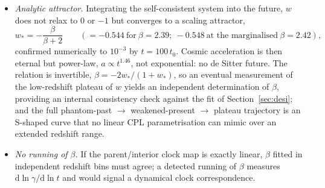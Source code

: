 \documentclass[11pt]{article}
\begin{document}
\begin{itemize}
\item[P7.] \emph{Analytic attractor.} Integrating the self-consistent system into the future, $w$ does not relax to $0$ or $-1$ but converges to a scaling attractor,
\begin{equation}
w_* = -\frac{\beta}{\beta+2} \qquad (= -0.544 \ \text{for} \ \beta = 2.39;\ -0.548 \ \text{at the marginalised} \ \beta = 2.42),
\end{equation}
confirmed numerically to $10^{-3}$ by $t = 100\,t_0$. Cosmic acceleration is then eternal but power-law, $a \propto t^{1.46}$, not exponential: no de Sitter future. The relation is invertible, $\beta = -2w_*/(1+w_*)$, so an eventual measurement of the low-redshift plateau of $w$ yields an independent determination of $\beta$, providing an internal consistency check against the fit of Section~\ref{sec:desi}; and the full phantom-past $\to$ weakened-present $\to$ plateau trajectory is an S-shaped curve that no linear CPL parametrisation can mimic over an extended redshift range.
\item[P8.] \emph{No running of $\beta$.} If the parent/interior clock map is exactly linear, $\beta$ fitted in independent redshift bins must agree; a detected running of $\beta$ measures $\mathrm{d}\ln\gamma/\mathrm{d}\ln t$ and would signal a dynamical clock correspondence.

\end{itemize}
\end{document}
